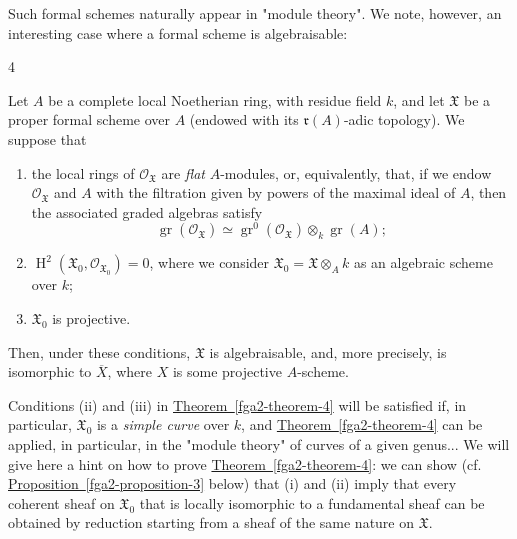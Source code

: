   Such formal schemes naturally appear in "module theory".
  We note, however, an interesting case where a formal scheme is algebraisable:\begin{theorem}{4}\label{fga2-theorem-4}\skipsinglepar\par{}Let \(A\) be a complete local Noetherian ring, with residue field \(k\), and let \(\mathfrak {X}\) be a proper formal scheme over \(A\) (endowed with its \(\mathfrak {r}(A)\)-adic topology).
    We suppose that

    
 \begin{enumerate}
      
 \item[i.]
        the local rings of \(\mathcal {O}_{\mathfrak {X}}\) are \emph{flat} \(A\)-modules, or, equivalently, that, if we endow \(\mathcal {O}_{\mathfrak {X}}\) and \(A\) with the filtration given by powers of the maximal ideal of \(A\), then the associated graded algebras satisfy
        \[           \operatorname {gr}(\mathcal {O}_{\mathfrak {X}})           \simeq  \operatorname {gr}^0(\mathcal {O}_{\mathfrak {X}})\otimes _k\operatorname {gr}(A);         \]
      


      
 \item[ii.]
        \(\operatorname {H}^2(\mathfrak {X}_0,\mathcal {O}_{\mathfrak {X}_0})=0\), where we consider \(\mathfrak {X}_0=\mathfrak {X}\otimes _Ak\) as an algebraic scheme over \(k\);
      


      
 \item[iii.]
        \(\mathfrak {X}_0\) is projective.
      

    \end{enumerate}


    
    Then, under these conditions, \(\mathfrak {X}\) is algebraisable, and, more precisely, is isomorphic to \(\overline {X}\), where \(X\) is some projective \(A\)-scheme.\end{theorem}\par{}Conditions (ii) and (iii) in \hyperref[fga2-theorem-4]{Theorem~\ref*{fga2-theorem-4}} will be satisfied if, in particular, \(\mathfrak {X}_0\) is a \emph{simple curve} over \(k\), and \hyperref[fga2-theorem-4]{Theorem~\ref*{fga2-theorem-4}} can be applied, in particular, in the "module theory" of curves of a given genus...
  We will give here a hint on how to prove \hyperref[fga2-theorem-4]{Theorem~\ref*{fga2-theorem-4}}:
  we can show (cf. \hyperref[fga2-proposition-3]{Proposition~\ref*{fga2-proposition-3}} below) that (i) and (ii) imply that every coherent sheaf on \(\mathfrak {X}_0\) that is locally isomorphic to a fundamental sheaf can be obtained by reduction starting from a sheaf of the same nature on \(\mathfrak {X}\).
